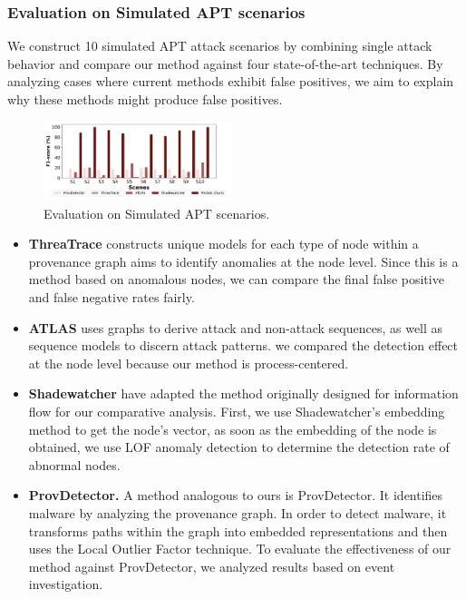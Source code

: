 \subsubsection{Evaluation on Simulated APT scenarios}
We construct 10 simulated APT attack scenarios by combining single attack behavior and compare our method against four state-of-the-art techniques. By analyzing cases where current methods exhibit false positives, we aim to explain why these methods might produce false positives.

\begin{figure}[ht]
    \centering
      \includegraphics[width=0.49\textwidth]{figs/compare.pdf}
    \caption{Evaluation on Simulated APT scenarios.}
    \label{fig-eva-apt}
\end{figure}

\begin{itemize}
    \item \textbf{ThreaTrace}\cite{wang2022threatrace} constructs unique models for each type of node within a provenance graph aims to identify anomalies at the node level. Since this is a method based on anomalous nodes, we can compare the final false positive and false negative rates fairly.
    \item \textbf{ATLAS}\cite{alsaheel2021atlas} uses graphs to derive attack and non-attack sequences, as well as sequence models to discern attack patterns. we compared the detection effect at the node level because our method is process-centered.
    \item \textbf{Shadewatcher} \cite{zengy2022shadewatcher} have adapted the method originally designed for information flow for our comparative analysis. First, we use Shadewatcher's embedding method to get the node's vector, as soon as the embedding of the node is obtained, we use LOF anomaly detection to determine the detection rate of abnormal nodes.
    \item \textbf{ProvDetector.} A method analogous to ours is ProvDetector\cite{wang2020you}. It identifies malware by analyzing the provenance graph. In order to detect malware, it transforms paths within the graph into embedded representations and then uses the Local Outlier Factor technique. To evaluate the effectiveness of our method against ProvDetector, we analyzed results based on event investigation.
\end{itemize}


